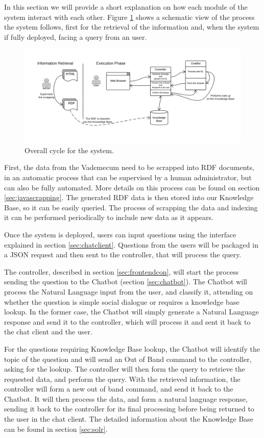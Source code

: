 In this section we will provide a short explanation on how each module of the system interact with each other. Figure \ref{fig:lifecycle} shows a schematic view of the process the system follows, first for the retrieval of the information and, when the system if fully deployed, facing a query from an user.

\begin{figure}[!htbp]
    \centering
    \includegraphics[width=\textwidth]{img/prot/lifecycle.png}
    \caption{Overall cycle for the system.}
    \label{fig:lifecycle}
\end{figure}

First, the data from the Vademecum need to be scrapped into \ac{RDF} documents, in an automatic process that can be supervised by a human administrator, but can also be fully automated. More details on this process can be found on section \ref{sec:javascrapping}. The generated \ac{RDF} data is then stored into our Knowledge Base, so it can be easily queried. The process of scrapping the data and indexing it can be performed periodically to include new data as it appears.

Once the system is deployed, users can input questions using the interface explained in section \ref{sec:chatclient}. Questions from the users will be packaged in a JSON request and then sent to the controller, that will process the query.

The controller, described in section \ref{sec:frontendcon}, will start the process sending the question to the Chatbot (section \ref{sec:chatbot}). The Chatbot will process the Natural Language input from the user, and classify it, attending on whether the question is simple social dialogue or requires a knowledge base lookup. In the former case, the Chatbot will simply generate a Natural Language response and send it to the controller, which will process it and sent it back to the chat client and the user. 

For the questions requiring Knowledge Base lookup, the Chatbot will identify the topic of the question and will send an Out of Band command to the controller, asking for the lookup. The controller will then form the query to retrieve the requested data, and perform the query. With the retrieved information, the controller will form a new out of band command, and send it back to the Chatbot. It will then process the data, and form a natural language response, sending it back to the controller for its final processing before being returned to the user in the chat client. The detailed information about the Knowledge Base can be found in section \ref{sec:solr}.

